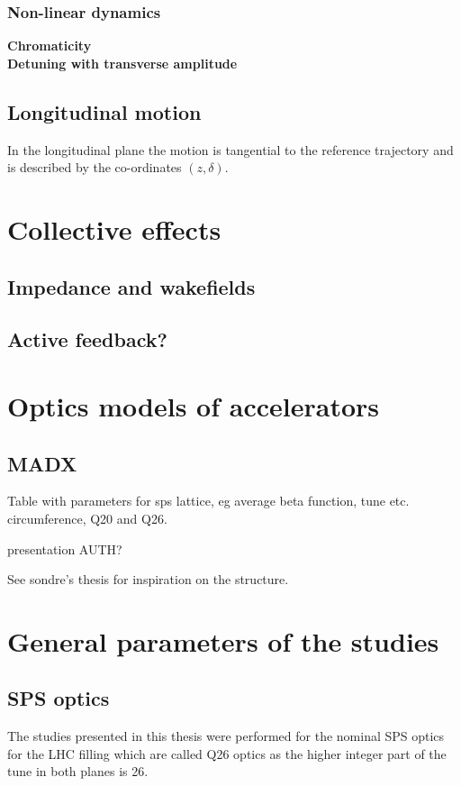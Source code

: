 \subsubsection{Non-linear dynamics}
\textbf{Chromaticity}\\

\textbf{Detuning with transverse amplitude}\\

\subsection{Longitudinal motion}
In the longitudinal plane the motion is tangential to the reference trajectory and is described by the co-ordinates $(z, \delta)$. 



\section{Collective effects}
\subsection{Impedance and wakefields}

\subsection{Active feedback?}
\section{Optics models of accelerators}
\subsection*{MADX}
Table with parameters for sps lattice, eg average beta function, tune etc. circumference, Q20 and Q26.

presentation AUTH?


See sondre's thesis for inspiration on the structure.
\section{General parameters of the studies}
\subsection{SPS optics}\label{subsec:SPS_optics_model}
 The studies presented in this thesis were performed for the nominal SPS optics for the LHC filling which are called Q26 optics as the higher integer part of the tune in both planes is 26. 

